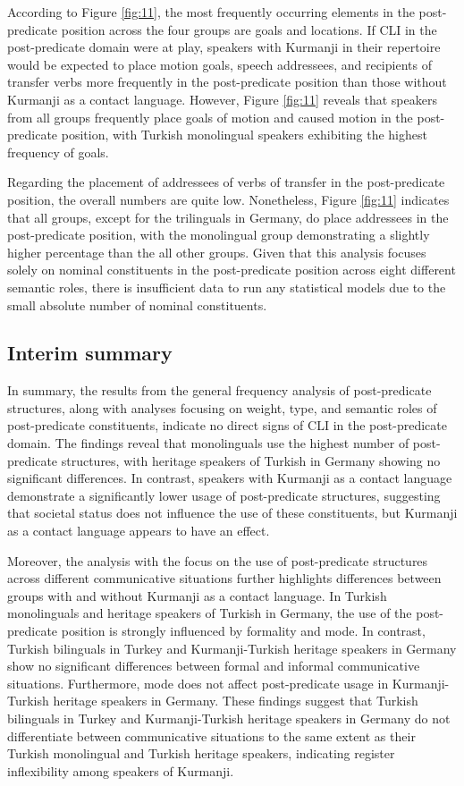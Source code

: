 According to Figure \ref{fig:11}, the most frequently occurring elements in the post-predicate position across the four groups are goals and locations. If CLI in the post-predicate domain were at play, speakers with Kurmanji in their repertoire would be expected to place motion goals, speech addressees, and recipients of transfer verbs more frequently in the post-predicate position than those without Kurmanji as a contact language. However, Figure \ref{fig:11} reveals that speakers from all groups frequently place goals of motion and caused motion in the post-predicate position, with Turkish monolingual speakers exhibiting the highest frequency of goals.

Regarding the placement of addressees of verbs of transfer in the post-predicate position, the overall numbers are quite low. Nonetheless, Figure \ref{fig:11} indicates that all groups, except for the trilinguals in Germany, do place addressees in the post-predicate position, with the monolingual group demonstrating a slightly higher percentage than the all other groups.  Given that this analysis focuses solely on nominal constituents in the post-predicate position across eight different semantic roles, there is insufficient data to run any statistical models due to the small absolute number of nominal constituents.

\subsection{Interim summary}\label{sec:key:5.3.4}

In summary, the results from the general frequency analysis of post-predicate structures, along with analyses focusing on weight, type, and semantic roles of post-predicate constituents, indicate no direct signs of CLI in the post-predicate domain. The findings reveal that monolinguals use the highest number of post-predicate structures, with heritage speakers of Turkish in Germany showing no significant differences. In contrast, speakers with Kurmanji as a contact language demonstrate a significantly lower usage of post-predicate structures, suggesting that societal status does not influence the use of these constituents, but Kurmanji as a contact language appears to have an effect.

Moreover, the analysis with the focus on the use of post-predicate structures across different communicative situations further highlights differences between groups with and without Kurmanji as a contact language. In Turkish monolinguals and heritage speakers of Turkish in Germany, the use of the post-predicate position is strongly influenced by formality and mode. In contrast, Turkish bilinguals in Turkey and Kurmanji-Turkish heritage speakers in Germany show no significant differences between formal and informal communicative situations. Furthermore, mode does not affect post-predicate usage in Kurmanji-Turkish heritage speakers in Germany. These findings suggest that Turkish bilinguals in Turkey and Kurmanji-Turkish heritage speakers in Germany do not differentiate between communicative situations to the same extent as their Turkish monolingual and Turkish heritage speakers, indicating register inflexibility among speakers of Kurmanji.

